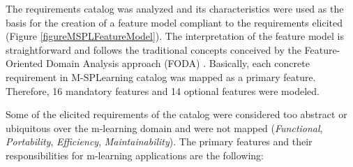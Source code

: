 The requirements catalog was analyzed and its characteristics were used as the basis for the creation of a feature model compliant to the requirements elicited (Figure \ref{figureMSPLFeatureModel}). The interpretation of the feature model is straightforward and follows the traditional concepts conceived by the Feature-Oriented Domain Analysis approach (FODA) \cite{kang90}. Basically, each concrete requirement in M-SPLear\allowbreak ning catalog was mapped as a primary feature. Therefore, 16 mandatory features and 14 optional features were modeled.

Some of the elicited requirements of the catalog were considered too abstract or ubiquitous over the m-learning domain and were not mapped (\textit{Functional}, \textit{Portability}, \textit{Efficiency}, \textit{Maintainability}). The primary features and their responsibilities for m-learning applications are the following:

